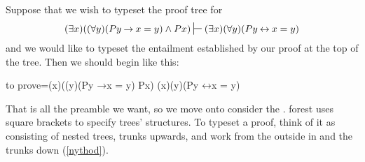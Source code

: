 \documentclass[10pt,british,a4paper,doc2]{ltxdoc}
\newcommand*\pkg[1]{\textsf{#1}}
\newcommand*{\lif}{\ensuremath{\mathbin{\rightarrow}}}
\newcommand*{\liff}{\ensuremath{\mathbin{\leftrightarrow}}}
\begin{document}
Suppose that we wish to typeset the proof tree for
\[
  (\exists x)((\forall y)(Py \lif x = y) \land Px) \sststile{}{} (\exists x)(\forall y)(Py \liff x = y)
\]
and we would like to typeset the entailment established by our proof at the top of the tree.
Then we should begin like this:
\begin{latexcode}
\begin{tableau}
  {
    to prove={(\exists x)((\forall y)(Py \lif x = y) \land Px) \sststile{}{} (\exists x)(\forall y)(Py \liff x = y)}
  }
\end{tableau}
\end{latexcode}
That is all the preamble we want, so we move onto consider the .
\pkg{forest} uses square brackets to specify trees' structures.
To typeset a proof, think of it as consisting of nested trees, trunks upwards, and work from the outside in and the trunks down (\cref{nythod}).
\end{document}
